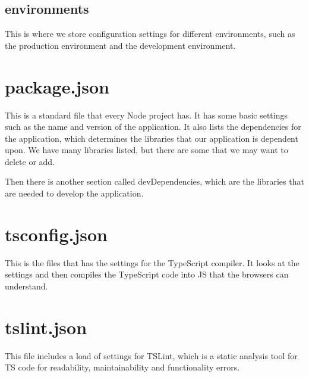 \subsection{environments}
This is where we store configuration settings for different environments, such as the production environment and the development environment.

\section{package.json}
This is a standard file that every Node project has. It has some basic settings such as the name and version of the application. It also lists the dependencies for the application, which determines the libraries that our application is dependent upon. We have many libraries listed, but there are some that we may want to delete or add.

Then there is another section called devDependencies, which are the libraries that are needed to develop the application.

\section{tsconfig.json}
This is the files that has the settings for the TypeScript compiler. It looks at the settings and then compiles the TypeScript code into JS that the browsers can understand.

\section{tslint.json}
This file includes a load of settings for TSLint, which is a static analysis tool for TS code for readability, maintainability and functionality errors.